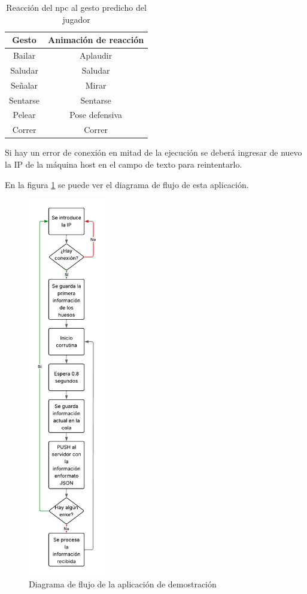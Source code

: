 \begin{table}[H]
    \begin{center}
        \begin{tabular}{| c | c |}
            \hline
            Gesto & Animación de reacción \\ \hline
            Bailar & Aplaudir \\
            Saludar & Saludar \\
            Señalar & Mirar \\ 
            Sentarse & Sentarse \\
            Pelear & Pose defensiva \\
            Correr & Correr \\ \hline
        \end{tabular}
        \caption{Reacción del \gls{npc} al gesto predicho del jugador}
        \label{tab:gestos-reaccion}
    \end{center}
\end{table}

Si hay un error de conexión en mitad de la ejecución se deberá ingresar de nuevo la IP de la máquina host en el campo de texto para reintentarlo.

En la figura \ref{fig:Demo} se puede ver el diagrama de flujo de esta aplicación.

\begin{figure}[H]
	\centering
	\includegraphics[width=0.3\textwidth]{Imagenes/Vectorial/FlujoAppFinal.pdf}
	\caption{Diagrama de flujo de la aplicación de demostración}
	\label{fig:Demo}
\end{figure}